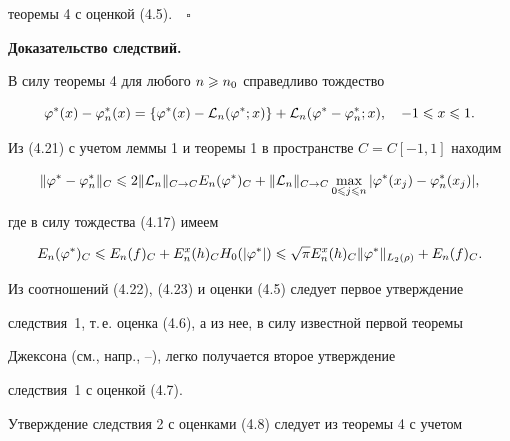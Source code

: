 теоремы 4 с оценкой (4.5).$\quad\square$


\medskip





{\bf Доказательство следствий.}


В силу теоремы 4 для любого $n\geqslant n_0$ справедливо тождество


\begin{equation}


\vp^*(x) - \vp_n^*(x)=\{\vp^*(x)-\rL_n(\vp^*;x)\}+\rL_n(\vp^* - \vp_n^*;x),


\quad -1\lea x\lea 1.


\end{equation}


Из (4.21) с учетом леммы 1 и теоремы 1 в пространстве $C=C[-1,1]$ находим


\begin{equation}


\|\varphi ^{*} - \varphi_n^{*}\|_{C}\lea


2\|\rL_{n}\|_{C \rightarrow C}E_{n}(\varphi^{*})_{C}+


\|\rL_{n}\|_{C \rightarrow C}\maxl_{0\lea j\lea n}


| \varphi ^{*}(x_{j}) - \varphi ^{*}_{n}(x_{j})|,


\end{equation}


где в силу тождества (4.17) имеем


\begin{equation}


E_{n}(\varphi^{*})_{C} \lea E_{n}(f)_{C}+E_{n}^{x}(h)_{C}H_{0}


(|\varphi ^{*}|)\lea \sqrt{\pi}E_{n}^{x}(h)_{C}\|\varphi ^{*}


\|_{L_{2}(\rho)}+E_{n}(f)_{C}.


\end{equation}


Из соотношений (4.22), (4.23) и оценки (4.5) следует первое утверждение 


следствия~1, т.\,е. оценка (4.6), а из нее, в силу известной первой теоремы 


Джексона (см., напр., \cite{13}--\cite{15}), легко получается второе утверждение 


следствия~1 с оценкой (4.7).





Утверждение следствия 2 с оценками (4.8) следует из теоремы 4 с учетом 


